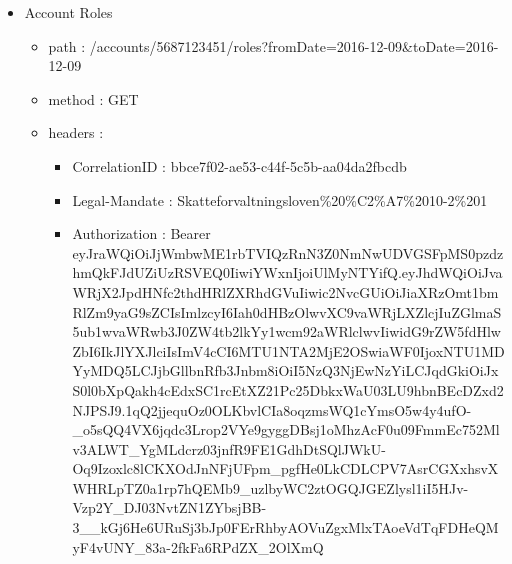 \documentclass[12pt]{report}
\begin{document}
\begin{itemize}
  \item Account Roles
  \begin{itemize}
    \item path : /accounts/5687123451/roles?fromDate=2016-12-09&toDate=2016-12-09
    \item method : GET
    \item headers :
    \begin{itemize}
      \item CorrelationID : bbce7f02-ae53-c44f-5c5b-aa04da2fbcdb
      \item Legal-Mandate : Skatteforvaltningsloven\%20\%C2\%A7\%2010-2\%201
      \item Authorization : Bearer eyJraWQiOiJjWmbwME1rbTVIQzRnN3Z0NmNwUDVGSFpMS0pzdzhmQkFJdUZiUzRSVEQ0IiwiYWxnIjoiUlMyNTYifQ.eyJhdWQiOiJvaWRjX2JpdHNfc2thdHRlZXRhdGVuIiwic2NvcGUiOiJiaXRzOmt1bmRlZm9yaG9sZCIsImlzcyI6Iah0dHBzOlwvXC9vaWRjLXZlcjIuZGlmaS5ub1wvaWRwb3J0ZW4tb2lkYy1wcm92aWRlclwvIiwidG9rZW5fdHlwZbI6IkJlYXJlciIsImV4cCI6MTU1NTA2MjE2OSwiaWF0IjoxNTU1MDYyMDQ5LCJjbGllbnRfb3Jnbm8iOiI5NzQ3NjEwNzYiLCJqdGkiOiJxS0l0bXpQakh4cEdxSC1rcEtXZ21Pc25DbkxWaU03LU9hbnBEcDZxd2NJPSJ9.1qQ2jjequOz0OLKbvlCIa8oqzmsWQ1cYmsO5w4y4ufO-\_o5sQQ4VX6jqdc3Lrop2VYe9gyggDBsj1oMhzAcF0u09FmmEc752Mlv3ALWT\_YgMLdcrz03jnfR9FE1GdhDtSQlJWkU-Oq9Izoxlc8lCKXOdJnNFjUFpm\_pgfHe0LkCDLCPV7AsrCGXxhsvXWHRLpTZ0a1rp7hQEMb9\_uzlbyWC2ztOGQJGEZlysl1iI5HJv-Vzp2Y\_DJ03NvtZN1ZYbsjBB-3\_\_kGj6He6URuSj3bJp0FErRhbyAOVuZgxMlxTAoeVdTqFDHeQMyF4vUNY\_83a-2fkFa6RPdZX\_2OlXmQ
    \end{itemize}
  \end{itemize}
\end{itemize}
\end{document}
